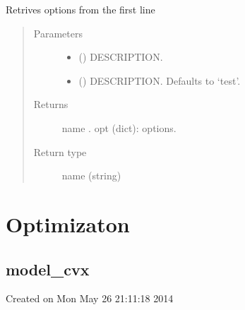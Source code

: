 \documentclass[letterpaper,10pt,english]{sphinxmanual}
\begin{document}
\begin{fulllineitems}
\label{\detokenize{index:modeljupytermagic.get_options}}
\pysigstartsignatures
{}
\pysigstopsignatures
\sphinxAtStartPar
Retrives options from the first line
\begin{quote}\begin{description}
\item[{Parameters}] \leavevmode\begin{itemize}
\item {} 
\sphinxAtStartPar
{} () \textendash{} DESCRIPTION.

\item {} 
\sphinxAtStartPar
{} (\sphinxstyleliteralemphasis{\sphinxupquote{, }}) \textendash{} DESCRIPTION. Defaults to ‘test’.

\end{itemize}

\item[{Returns}] \leavevmode
\sphinxAtStartPar
name .
opt (dict): options.

\item[{Return type}] \leavevmode
\sphinxAtStartPar
name (string)

\end{description}\end{quote}

\end{fulllineitems}



\chapter{Optimizaton}
\label{\detokenize{index:optimizaton}}

\section{model\_cvx}
\label{\detokenize{index:module-model_cvx}}\label{\detokenize{index:model-cvx}}
\sphinxAtStartPar
Created on Mon May 26 21:11:18 2014
\end{document}
